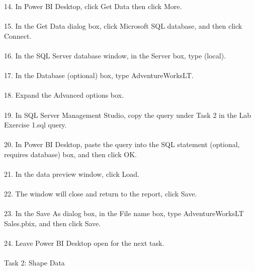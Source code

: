 \documentclass[12pt,letterpaper]{article}
\begin{document}
14. In Power BI Desktop, click Get Data then click More.\\\\
15. In the Get Data dialog box, click Microsoft SQL database, and then click Connect.\\\\
16. In the SQL Server database window, in the Server box, type (local).\\\\
17. In the Database (optional) box, type AdventureWorksLT.\\\\
18. Expand the Advanced options box.\\\\
19. In SQL Server Management Studio, copy the query under Task 2 in the Lab Exercise 1.sql query.\\\\
20. In Power BI Desktop, paste the query into the SQL statement (optional, requires database) box, and then click OK.\\\\
21. In the data preview window, click Load.\\\\
22. The window will close and return to the report, click Save.\\\\
23. In the Save As dialog box, in the File name box, type AdventureWorksLT Sales.pbix, and then click Save.\\\\
24. Leave Power BI Desktop open for the next task.\\\\

Task 2: Shape Data\\\\
\end{document}

